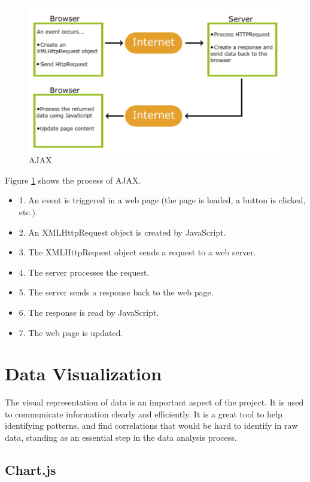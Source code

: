 \begin{figure}
    \centering
    \includegraphics[width=0.8\linewidth]{images/ajax2.png}
    \caption{AJAX}
    \label{fig:ajax}
\end{figure}

Figure \ref{fig:ajax} shows the process of AJAX. 

\begin{itemize}
    \item 1. An event is triggered in a web page (the page is loaded, a button is clicked, etc.).
    \item 2. An XMLHttpRequest object is created by JavaScript.
    \item 3. The XMLHttpRequest object sends a request to a web server.
    \item 4. The server processes the request.
    \item 5. The server sends a response back to the web page.
    \item 6. The response is read by JavaScript.
    \item 7. The web page is updated.
\end{itemize}

\section{Data Visualization}

The visual representation of data is an important aspect of the project. It is used to communicate information clearly and efficiently. 
It is a great tool to help identifying patterns, and find correlations that would be hard to identify in raw data, standing as an essential step in the data analysis process.

\subsection{Chart.js}

